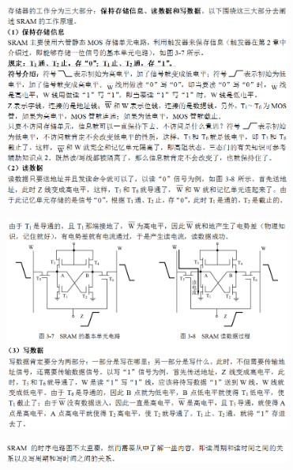 \includegraphics[width=3.69792in,height=2.61458in]{png-jpeg-pics/89C624DDEFD673747D10D5545A72FD66.png}

\includegraphics[width=3.69792in,height=2.76042in]{png-jpeg-pics/1B3F0091CA6E2A38063E572A3C7FDD8A.png}

\includegraphics[width=3.69792in,height=0.27083in]{png-jpeg-pics/17BD17A30521DC6C8064531A8177AF58.png}
